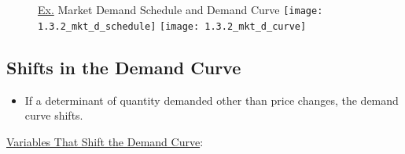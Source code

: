 	\begin{figure}[h]
	\underline{Ex.} Market Demand Schedule and Demand Curve
	\centering
	\texttt{[image: 1.3.2\_mkt\_d\_schedule]}
	\texttt{[image: 1.3.2\_mkt\_d\_curve]}
	\end{figure}
	
\subsection{Shifts in the Demand Curve}

	\begin{itemize}

	\item If a determinant of quantity demanded other than price changes, the demand curve shifts.

	\end{itemize}
	
	\underline{Variables That Shift the Demand Curve}:
	
